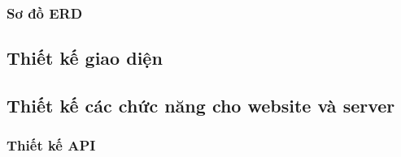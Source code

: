 \subsubsection{Sơ đồ ERD}


\subsection{Thiết kế giao diện}

\subsection{Thiết kế các chức năng cho website và server}

\subsubsection{Thiết kế API}




